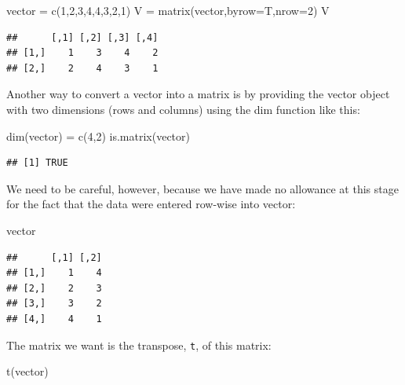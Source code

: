 \documentclass[
]{book}
\newenvironment{Shaded}{\begin{snugshade}}{\end{snugshade}}
\newcommand{\AttributeTok}[1]{\textcolor[rgb]{0.77,0.63,0.00}{#1}}
\newcommand{\DecValTok}[1]{\textcolor[rgb]{0.00,0.00,0.81}{#1}}
\newcommand{\FunctionTok}[1]{\textcolor[rgb]{0.00,0.00,0.00}{#1}}
\newcommand{\NormalTok}[1]{#1}
\newcommand{\OtherTok}[1]{\textcolor[rgb]{0.56,0.35,0.01}{#1}}
\begin{document}
\begin{Shaded}
\begin{Highlighting}[]
\NormalTok{vector }\OtherTok{=} \FunctionTok{c}\NormalTok{(}\DecValTok{1}\NormalTok{,}\DecValTok{2}\NormalTok{,}\DecValTok{3}\NormalTok{,}\DecValTok{4}\NormalTok{,}\DecValTok{4}\NormalTok{,}\DecValTok{3}\NormalTok{,}\DecValTok{2}\NormalTok{,}\DecValTok{1}\NormalTok{)}
\NormalTok{V }\OtherTok{=} \FunctionTok{matrix}\NormalTok{(vector,}\AttributeTok{byrow=}\NormalTok{T,}\AttributeTok{nrow=}\DecValTok{2}\NormalTok{)}
\NormalTok{V}
\end{Highlighting}
\end{Shaded}

\begin{verbatim}
##      [,1] [,2] [,3] [,4]
## [1,]    1    3    4    2
## [2,]    2    4    3    1
\end{verbatim}

Another way to convert a vector into a matrix is by providing the vector object with two dimensions (rows and columns) using the dim function like this:

\begin{Shaded}
\begin{Highlighting}[]
\FunctionTok{dim}\NormalTok{(vector) }\OtherTok{=} \FunctionTok{c}\NormalTok{(}\DecValTok{4}\NormalTok{,}\DecValTok{2}\NormalTok{)}
\FunctionTok{is.matrix}\NormalTok{(vector)}
\end{Highlighting}
\end{Shaded}

\begin{verbatim}
## [1] TRUE
\end{verbatim}

We need to be careful, however, because we have made no allowance at this stage for the fact that the data were entered row-wise into vector:

\begin{Shaded}
\begin{Highlighting}[]
\NormalTok{vector}
\end{Highlighting}
\end{Shaded}

\begin{verbatim}
##      [,1] [,2]
## [1,]    1    4
## [2,]    2    3
## [3,]    3    2
## [4,]    4    1
\end{verbatim}

The matrix we want is the transpose, \texttt{t}, of this matrix:

\begin{Shaded}
\begin{Highlighting}[]
\FunctionTok{t}\NormalTok{(vector)}
\end{Highlighting}
\end{Shaded}
\end{document}
